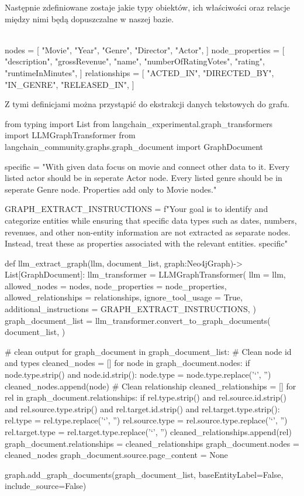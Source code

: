 \documentclass[
a4paper,
12pt,
]{article}
\begin{document}
\noindent{}Następnie zdefiniowane zostaje jakie typy obiektów, ich właściwości oraz relacje między nimi będą dopuszczalne w naszej bazie.
\begin{python}\\
nodes = [
    "Movie",
    "Year",
    "Genre",
    "Director",
    "Actor",
]
node_properties = [
    "description",
    "grossRevenue",
    "name",
    "numberOfRatingVotes",
    "rating",
    "runtimeInMinutes",
]
relationships = [
    "ACTED_IN",
    "DIRECTED_BY",
    "IN_GENRE",
    "RELEASED_IN",
]
\end{python}

\noindent{}Z tymi definicjami można przystąpić do ekstrakcji danych tekstowych do grafu.

\begin{python}
from typing import List
from langchain_experimental.graph_transformers import LLMGraphTransformer
from langchain_community.graphs.graph_document import GraphDocument

specific = "With given data focus on movie and connect other data to it. Every listed actor should be in seperate Actor node. Every listed genre should be in seperate Genre node. Properties add only to Movie nodes."

GRAPH_EXTRACT_INSTRUCTIONS = f"Your goal is to identify and categorize entities while ensuring that specific data types such as dates, numbers, revenues, and other non-entity information are not extracted as separate nodes. Instead, treat these as properties associated with the relevant entities. {specific}"

def llm_extract_graph(llm, document_list, graph:Neo4jGraph)-> List[GraphDocument]:
    llm_transformer = LLMGraphTransformer(
        llm = llm,
        allowed_nodes = nodes,
        node_properties = node_properties,
        allowed_relationships = relationships,
        ignore_tool_usage = True,
        additional_instructions = GRAPH_EXTRACT_INSTRUCTIONS,
    )
    graph_document_list = llm_transformer.convert_to_graph_documents(
        document_list,
    )

    # clean output
    for graph_document in graph_document_list:
    # Clean node id and types
        cleaned_nodes = []
        for node in graph_document.nodes:
            if node.type.strip() and node.id.strip():
                node.type = node.type.replace('`', '')
                cleaned_nodes.append(node)
        # Clean relationship
        cleaned_relationships = []
        for rel in graph_document.relationships:
            if rel.type.strip() and rel.source.id.strip() and rel.source.type.strip() and rel.target.id.strip() and rel.target.type.strip():
                rel.type = rel.type.replace('`', '')
                rel.source.type = rel.source.type.replace('`', '')
                rel.target.type = rel.target.type.replace('`', '')
                cleaned_relationships.append(rel)
        graph_document.relationships = cleaned_relationships
        graph_document.nodes = cleaned_nodes
        graph_document.source.page_content = None
        
    graph.add_graph_documents(graph_document_list, baseEntityLabel=False, include_source=False)
\end{python}
\end{document}
